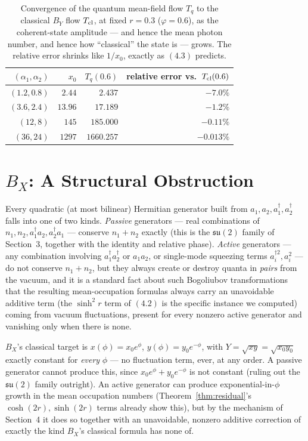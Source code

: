 \documentclass[11pt]{amsart}
\theoremstyle{remark}
\begin{document}
\begin{table}[h]
\centering
\begin{tabular}{r r r r}
$(\alpha_1,\alpha_2)$ & $x_0$ & $T_q(0.6)$ & relative error vs.\ $T_{\rm cl}(0.6)$ \\
\hline
$(1.2,0.8)$ & $2.44$ & $2.437$ & $-7.0\%$ \\
$(3.6,2.4)$ & $13.96$ & $17.189$ & $-1.2\%$ \\
$(12,8)$ & $145$ & $185.000$ & $-0.11\%$ \\
$(36,24)$ & $1297$ & $1660.257$ & $-0.013\%$ \\
\hline
\end{tabular}
\caption{Convergence of the quantum mean-field flow $T_q$ to the classical $B_Y$ flow $T_{\rm cl}$, at fixed $r=0.3$ ($\varphi=0.6$), as the coherent-state amplitude --- and hence the mean photon number, and hence how ``classical'' the state is --- grows. The relative error shrinks like $1/x_0$, exactly as $(4.3)$ predicts.}
\end{table}

\section{$B_X$: A Structural Obstruction}

Every quadratic (at most bilinear) Hermitian generator built from $a_1,a_2,a_1^\dagger,a_2^\dagger$ falls into one of two kinds. \emph{Passive} generators --- real combinations of $n_1,n_2,a_1^\dagger a_2,a_2^\dagger a_1$ --- conserve $n_1+n_2$ exactly (this is the $\mathfrak{su}(2)$ family of Section~3, together with the identity and relative phase). \emph{Active} generators --- any combination involving $a_1^\dagger a_2^\dagger$ or $a_1a_2$, or single-mode squeezing terms $a_i^{\dagger2},a_i^2$ --- do not conserve $n_1+n_2$, but they always create or destroy quanta in \emph{pairs} from the vacuum, and it is a standard fact about such Bogoliubov transformations that the resulting mean-occupation formulas always carry an unavoidable additive term (the $\sinh^2r$ term of $(4.2)$ is the specific instance we computed) coming from vacuum fluctuations, present for every nonzero active generator and vanishing only when there is none.

$B_X$'s classical target is $x(\phi)=x_0e^\phi$, $y(\phi)=y_0e^{-\phi}$, with $Y=\sqrt{xy}=\sqrt{x_0y_0}$ exactly constant for \emph{every} $\phi$ --- no fluctuation term, ever, at any order. A passive generator cannot produce this, since $x_0e^\phi+y_0e^{-\phi}$ is not constant (ruling out the $\mathfrak{su}(2)$ family outright). An active generator can produce exponential-in-$\phi$ growth in the mean occupation numbers (Theorem~\ref{thm:residual}'s $\cosh(2r),\sinh(2r)$ terms already show this), but by the mechanism of Section~4 it does so together with an unavoidable, nonzero additive correction of exactly the kind $B_X$'s classical formula has none of.
\end{document}
